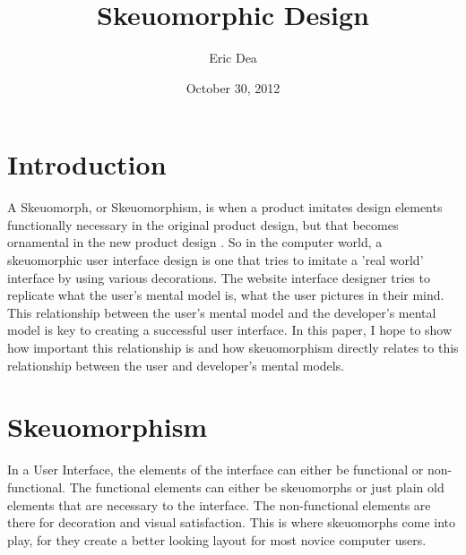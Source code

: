 \documentclass{article}
\title{Skeuomorphic Design}
\author{Eric Dea}
\date{October 30, 2012}
\begin{document}
\maketitle


\pagebreak
\tableofcontents

\pagebreak
\listoffigures

\pagebreak

%
%
\section{Introduction}
\label{introduction}

A Skeuomorph, or Skeuomorphism, is when a product imitates design elements functionally necessary in the original product design, but that becomes ornamental in the new product design \cite{wiki}.  So in the computer world, a skeuomorphic user interface design is one that tries to imitate a 'real world' interface by using various decorations.  The website interface designer tries to replicate what the user's mental model is, what the user pictures in their mind.  This relationship between the user's mental model and the developer's mental model is key to creating a successful user interface.  In this paper, I hope to show how important this relationship is and how skeuomorphism directly relates to this relationship between the user and developer's mental models.


\section{Skeuomorphism}

In a User Interface, the elements of the interface can either be functional or non-functional.  The functional elements can either be skeuomorphs or just plain old elements that are necessary to the interface.  The non-functional elements are there for decoration and visual satisfaction.  This is where skeuomorphs come into play, for they create a better looking layout for most novice computer users.
\end{document}

